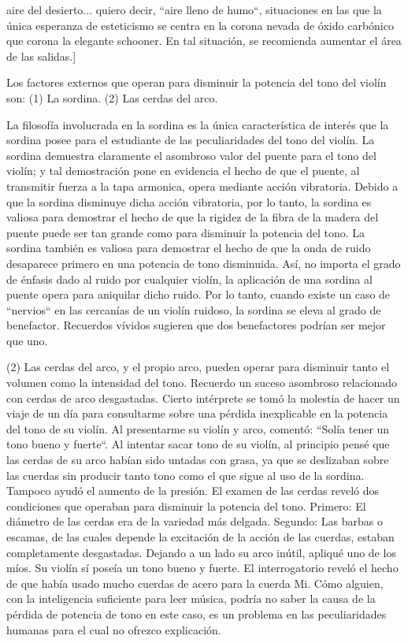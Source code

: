 \documentclass[12pt]{book}
\begin{document}
aire del desierto... quiero decir, ``aire lleno de humo``, situaciones en las que la única esperanza de esteticismo se centra en la corona nevada de óxido carbónico que corona la elegante schooner. En tal situación, se recomienda aumentar el área de las salidas.]

Los factores externos que operan para disminuir la potencia del tono del violín son: (1) La sordina. (2) Las cerdas del arco.

La filosofía involucrada en la sordina es la única característica de interés que la sordina posee para el estudiante de las peculiaridades del tono del violín. La sordina demuestra claramente el asombroso valor del puente para el tono del violín; y tal demostración pone en evidencia el hecho de que el puente, al transmitir fuerza a la tapa armonica, opera mediante acción vibratoria. Debido a que la sordina disminuye dicha acción vibratoria, por lo tanto, la sordina es valiosa para demostrar el hecho de que la rigidez de la fibra de la madera del puente puede ser tan grande como para disminuir la potencia del tono. La sordina también es valiosa para demostrar el hecho de que la onda de ruido desaparece primero en una potencia de tono disminuida. Así, no importa el grado de énfasis dado al ruido por cualquier violín, la aplicación de una sordina al puente opera para aniquilar dicho ruido. Por lo tanto, cuando existe un caso de ``nervios`` en las cercanías de un violín ruidoso, la sordina se eleva al grado de benefactor. Recuerdos vívidos sugieren que dos benefactores podrían ser mejor que uno.

(2) Las cerdas del arco, y el propio arco, pueden operar para disminuir tanto el volumen como la intensidad del tono. Recuerdo un suceso asombroso relacionado con cerdas de arco desgastadas. Cierto intérprete se tomó la molestia de hacer un viaje de un día para consultarme sobre una pérdida inexplicable en la potencia del tono de su violín. Al presentarme su violín y arco, comentó: ``Solía tener un tono bueno y fuerte``. Al intentar sacar tono de su violín, al principio pensé que las cerdas de su arco habían sido untadas con grasa, ya que se deslizaban sobre las cuerdas sin producir tanto tono como el que sigue al uso de la sordina. Tampoco ayudó el aumento de la presión. El examen de las cerdas reveló dos condiciones que operaban para disminuir la potencia del tono. Primero: El diámetro de las cerdas era de la variedad más delgada. Segundo: Las barbas o escamas, de las cuales depende la excitación de la acción de las cuerdas, estaban completamente desgastadas. Dejando a un lado su arco inútil, apliqué uno de los míos. Su violín sí poseía un tono bueno y fuerte. El interrogatorio reveló el hecho de que había usado mucho cuerdas de acero para la cuerda Mi. Cómo alguien, con la inteligencia suficiente para leer música, podría no saber la causa de la pérdida de potencia de tono en este caso, es un problema en las peculiaridades humanas para el cual no ofrezco explicación.
\end{document}
